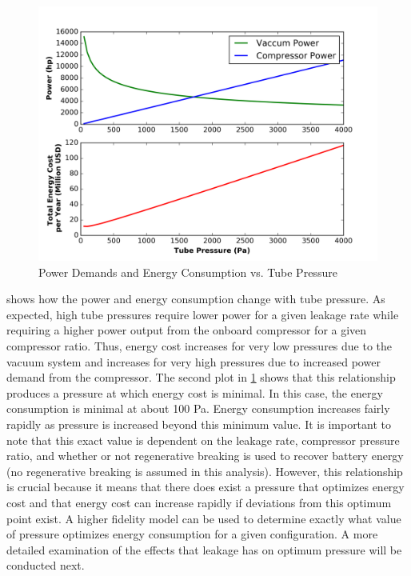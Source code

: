 \begin{figure}
	\centering
	\includegraphics{../../images/graphs/pressure_trades/pressure_vs_power.png}
	\caption{Power Demands and Energy Consumption vs. Tube Pressure}
	\label{fig:pow_demands_vs_tube_press}
\end{figure}
 shows how the power and energy consumption change with tube pressure. As expected, high tube pressures require lower power for a given leakage rate while requiring a higher power output from the onboard compressor for a given compressor ratio. Thus, energy cost increases for very low pressures due to the vacuum system and increases for very high pressures due to increased power demand from the compressor. The second plot in \cref{fig:pow_demands_vs_tube_press} shows that this relationship produces a pressure at which energy cost is minimal. In this case, the energy consumption is minimal at about 100 Pa. Energy consumption increases fairly rapidly as pressure is increased beyond this minimum value. It is important to note that this exact value is dependent on the leakage rate, compressor pressure ratio, and whether or not regenerative breaking is used to recover battery energy (no regenerative breaking is assumed in this analysis). However, this relationship is crucial because it means that there does exist a pressure that optimizes energy cost and that energy cost can increase rapidly if deviations from this optimum point exist. A higher fidelity model can be used to determine exactly what value of pressure optimizes energy consumption for a given configuration. A more detailed examination of the effects that leakage has on optimum pressure will be conducted next.
